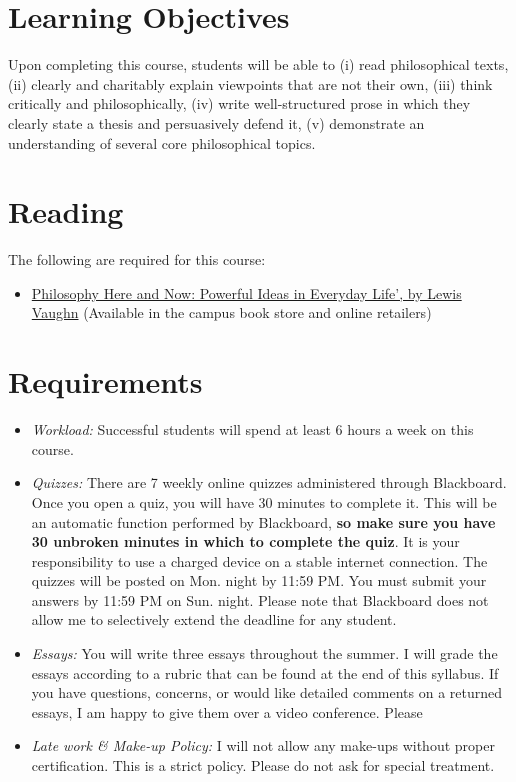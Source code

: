 \documentclass[11pt,article,oneside]{memoir}
\begin{document}
\section{Learning Objectives}

Upon completing this course, students will be able to (i) read
philosophical texts, (ii) clearly and charitably explain viewpoints that
are not their own, (iii) think critically and philosophically, (iv)
write well-structured prose in which they clearly state a thesis and
persuasively defend it, (v) demonstrate an understanding of several core
philosophical topics.

\section{Reading}

The following are required for this course:

\begin{itemize}
\item
  \href{http://www.amazon.com/Philosophy-Here-Now-Powerful-Everyday/dp/0199765227}{Philosophy
  Here and Now: Powerful Ideas in Everyday Life', by Lewis Vaughn}
  (Available in the campus book store and online retailers)
\end{itemize}

\section{Requirements}

\begin{itemize}
\item \textit{Workload:} Successful students will spend at least 6 hours a week on this course. 


\item \textit{Quizzes:} There are 7 weekly online quizzes administered through Blackboard. Once you open a quiz, you will have
30 minutes to complete it. This will be an automatic function performed
by Blackboard, \textbf{so make sure you have 30 unbroken minutes in
which to complete the quiz}. It is your responsibility to use a charged
device on a stable internet connection. The quizzes will be posted on
Mon. night by 11:59 PM. You must submit your answers by 11:59 PM on Sun.
night. Please note that Blackboard does not allow me to selectively
extend the deadline for any student.

\item \textit{Essays:} You will write three essays throughout the summer. I will grade the essays according to a rubric that can be found at the end of this syllabus. If you have questions, concerns, or would like detailed comments on a
returned essays, I am happy to give them over a video conference. Please 


\item \textit{Late work \& Make-up Policy:}  I will not allow any
make-ups without proper certification. This is a strict policy.
Please do not ask for special treatment.

\end{itemize}
\end{document}
